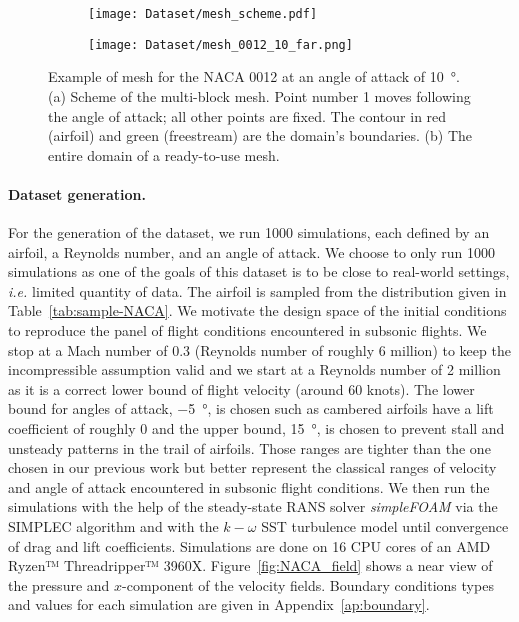\begin{figure}
	\centering
	\begin{subfigure}{0.49\textwidth}
		\centering
		\texttt{[image: Dataset/mesh\_scheme.pdf]}
		\caption{}
	\end{subfigure}
	\begin{subfigure}{0.49\textwidth}
		\centering
		\texttt{[image: Dataset/mesh\_0012\_10\_far.png]}
		\caption{}
	\end{subfigure}
	\caption{Example of mesh for the NACA 0012 at an angle of attack of \SI{10}{\degree}. (a) Scheme of the multi-block mesh. Point number 1 moves following the angle of attack; all other points are fixed. The contour in red (airfoil) and green (freestream) are the domain's boundaries. (b) The entire domain of a ready-to-use mesh.}
	\label{fig:mesh_scheme}
\end{figure}

\paragraph{Dataset generation.} For the generation of the dataset, we run \SI{1000}{} simulations, each defined by an airfoil, a Reynolds number, and an angle of attack. We choose to only run \SI{1000}{} simulations as one of the goals of this dataset is to be close to real-world settings, \emph{i.e.} limited quantity of data. The airfoil is sampled from the distribution given in Table~\ref{tab:sample-NACA}. We motivate the design space of the initial conditions to reproduce the panel of flight conditions encountered in subsonic flights. We stop at a Mach number of 0.3 (Reynolds number of roughly 6 million) to keep the incompressible assumption valid and we start at a Reynolds number of 2 million as it is a correct lower bound of flight velocity (around 60 knots). The lower bound for angles of attack, \SI{-5}{\degree}, is chosen such as cambered airfoils have a lift coefficient of roughly 0 and the upper bound, \SI{15}{\degree}, is chosen to prevent stall and unsteady patterns in the trail of airfoils. Those ranges are tighter than the one chosen in our previous work \cite{bonnet2022an} but better represent the classical ranges of velocity and angle of attack encountered in subsonic flight conditions. We then run the simulations with the help of the steady-state RANS solver \emph{simpleFOAM} via the SIMPLEC algorithm \cite{SIMPLE, SIMPLEC} and with the $k-\omega$ SST turbulence model \cite{SST} until convergence of drag and lift coefficients. Simulations are done on 16 CPU cores of an AMD Ryzen™ Threadripper™ 3960X. Figure~\ref{fig:NACA_field} shows a near view of the pressure and $x$-component of the velocity fields. Boundary conditions types and values for each simulation are given in Appendix~\ref{ap:boundary}.

